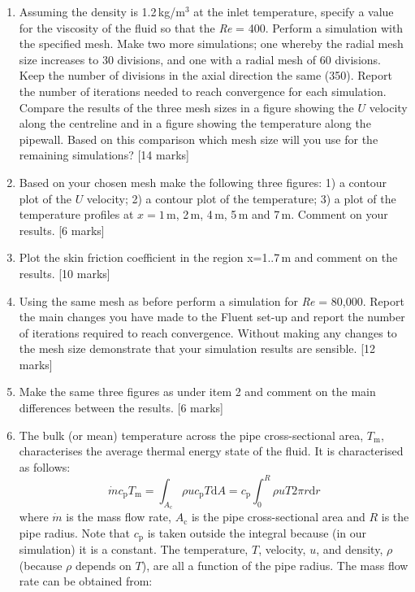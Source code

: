 \documentclass[11pt,a4paper,oneside]{scrartcl}
\newcommand\Rey{\mbox{\textit{Re}}\,\,}
\begin{document}
\begin{enumerate}
\item  Assuming the density is 1.2\,kg/m$^3$ at the inlet temperature, specify a value for the viscosity of the fluid so that the \Rey= 400. Perform a simulation with the specified mesh. Make two more simulations; one whereby the radial mesh size increases to 30 divisions, and one with a radial mesh of 60 divisions. Keep the number of divisions in the axial direction the same (350). Report the number of iterations needed to reach convergence for each simulation. Compare the results of the three mesh sizes in a figure showing the $U$ velocity along the centreline and in a figure showing the temperature along the pipewall. Based on this comparison which mesh size will you use for the remaining simulations? [14 marks]
\item Based on your chosen mesh make the following three figures: 1) a contour plot of the $U$ velocity; 2) a contour plot of the temperature; 3) a plot of the temperature profiles at $x=1\,$m, 2\,m, 4\,m, 5\,m and 7\,m. Comment on your results. [6 marks]
\item Plot the skin friction coefficient in the region x=1..7\,m and comment on the results.  [10 marks]
\item Using the same mesh as before perform a simulation for \Rey= 80,000. Report the main changes you have made to the Fluent set-up and report the number of iterations required to reach convergence. Without making any changes to the mesh size demonstrate that your simulation results are sensible.  [12 marks]
\item Make the same three figures as under item 2 and comment on the main differences between the results. [6 marks]
\item The bulk (or mean) temperature across the pipe cross-sectional area, $T_\mathrm{m}$, characterises the average thermal energy state of the fluid. It is characterised as follows:
\begin{equation}
    \dot{m}c_\mathrm{p}T_\mathrm{m}=\int_{A_\mathrm{c}}\rho uc_\mathrm{p} T\mathrm{d}A=c_\mathrm{p}\int_0^R\rho uT2\pi r \mathrm{d}r %
\end{equation}
    where $\dot{m}$ is the mass flow rate, $A_\mathrm{c}$ is the pipe cross-sectional area and $R$ is the pipe radius. Note that $c_\mathrm{p}$ is taken outside the integral because (in our simulation) it is a constant. The temperature, $T$, velocity, $u$, and density, $\rho$ (because $\rho$ depends on $T$), are all a function of the pipe radius. The mass flow rate can be obtained from:

\end{enumerate}
\end{document}

